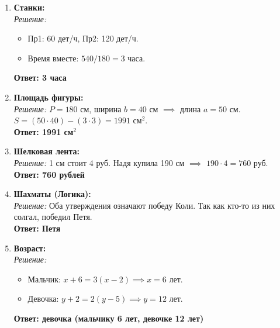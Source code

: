 \begin{enumerate}
    \item \textbf{Станки:} \\
    \textit{Решение:}
    \begin{itemize}
        \item Пр1: 60 дет/ч, Пр2: 120 дет/ч.
        \item Время вместе: $540 / 180 = 3$ часа.
    \end{itemize}
    \textbf{Ответ: 3 часа}

    \item \textbf{Площадь фигуры:} \\
    \textit{Решение:} $P = 180$ см, ширина $b = 40$ см $\implies$ длина $a = 50$ см. \\
    $S = (50 \cdot 40) - (3 \cdot 3) = 1991 \text{ см}^2$. \\
    \textbf{Ответ: 1991 см$^2$ }

    \item \textbf{Шелковая лента:} \\
    \textit{Решение:} 1 см стоит 4 руб. Надя купила 190 см $\implies$ $190 \cdot 4 = 760$ руб. \\
    \textbf{Ответ: 760 рублей}

    \item \textbf{Шахматы (Логика):} \\
    \textit{Решение:} Оба утверждения означают победу Коли. Так как кто-то из них солгал, победил Петя. \\
    \textbf{Ответ: Петя}

    \item \textbf{Возраст:} \\
    \textit{Решение:}
    \begin{itemize}
        \item Мальчик: $x + 6 = 3(x - 2) \implies x = 6$ лет.
        \item Девочка: $y + 2 = 2(y - 5) \implies y = 12$ лет.
    \end{itemize}
    \textbf{Ответ: девочка (мальчику 6 лет, девочке 12 лет)}
\end{enumerate}